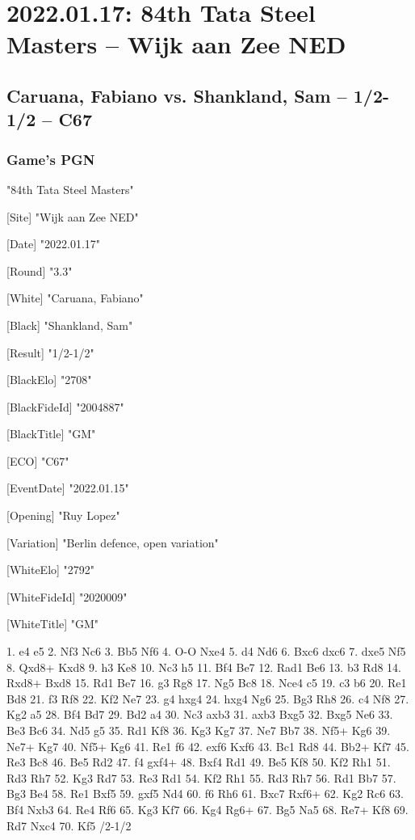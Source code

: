 \documentclass[9pt]{extarticle}
\begin{document}
\section*{2022.01.17: 84th Tata Steel Masters -- Wijk aan Zee NED}

\subsection*{Caruana, Fabiano vs. Shankland, Sam -- 1/2-1/2 -- C67}
\subsubsection*{Game's PGN}
\begin{flushleft}
[Event] "84th Tata Steel Masters"

[Site] "Wijk aan Zee NED"

[Date] "2022.01.17"

[Round] "3.3"

[White] "Caruana, Fabiano"

[Black] "Shankland, Sam"

[Result] "1/2-1/2"

[BlackElo] "2708"

[BlackFideId] "2004887"

[BlackTitle] "GM"

[ECO] "C67"

[EventDate] "2022.01.15"

[Opening] "Ruy Lopez"

[Variation] "Berlin defence, open variation"

[WhiteElo] "2792"

[WhiteFideId] "2020009"

[WhiteTitle] "GM"

\end{flushleft}
\begin{flushleft}
1. e4 e5 2. Nf3 Nc6 3. Bb5 Nf6 4. O-O Nxe4 5. d4 Nd6 6. Bxc6 dxc6 7. dxe5 Nf5 8. Qxd8+ Kxd8 9. h3 Ke8 10. Nc3 h5 11. Bf4 Be7 12. Rad1 Be6 13. b3 Rd8 14. Rxd8+ Bxd8 15. Rd1 Be7 16. g3 Rg8 17. Ng5 Bc8 18. Nce4 c5 19. c3 b6 20. Re1 Bd8 21. f3 Rf8 22. Kf2 Ne7 23. g4 hxg4 24. hxg4 Ng6 25. Bg3 Rh8 26. c4 Nf8 27. Kg2 a5 28. Bf4 Bd7 29. Bd2 a4 30. Nc3 axb3 31. axb3 Bxg5 32. Bxg5 Ne6 33. Be3 Bc6 34. Nd5 g5 35. Rd1 Kf8 36. Kg3 Kg7 37. Ne7 Bb7 38. Nf5+ Kg6 39. Ne7+ Kg7 40. Nf5+ Kg6 41. Re1 f6 42. exf6 Kxf6 43. Bc1 Rd8 44. Bb2+ Kf7 45. Re3 Bc8 46. Be5 Rd2 47. f4 gxf4+ 48. Bxf4 Rd1 49. Be5 Kf8 50. Kf2 Rh1 51. Rd3 Rh7 52. Kg3 Rd7 53. Re3 Rd1 54. Kf2 Rh1 55. Rd3 Rh7 56. Rd1 Bb7 57. Bg3 Be4 58. Re1 Bxf5 59. gxf5 Nd4 60. f6 Rh6 61. Bxc7 Rxf6+ 62. Kg2 Rc6 63. Bf4 Nxb3 64. Re4 Rf6 65. Kg3 Kf7 66. Kg4 Rg6+ 67. Bg5 Na5 68. Re7+ Kf8 69. Rd7 Nxc4 70. Kf5 \quad  {}/2-1/2
\end{flushleft}
\end{document}
